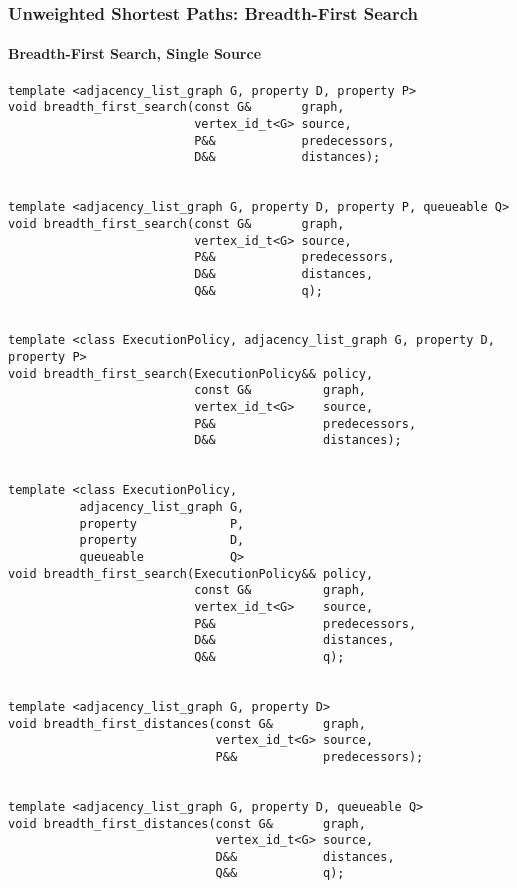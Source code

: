 \subsubsection{Unweighted Shortest Paths: Breadth-First Search}

\paragraph{Breadth-First Search, Single Source}
\begin{lstlisting}
template <adjacency_list_graph G, property D, property P>
void breadth_first_search(const G&       graph,
                          vertex_id_t<G> source,
                          P&&            predecessors,
                          D&&            distances);


template <adjacency_list_graph G, property D, property P, queueable Q>
void breadth_first_search(const G&       graph,
                          vertex_id_t<G> source,
                          P&&            predecessors,
                          D&&            distances,
                          Q&&            q);


template <class ExecutionPolicy, adjacency_list_graph G, property D, property P>
void breadth_first_search(ExecutionPolicy&& policy,
                          const G&          graph,
                          vertex_id_t<G>    source,
                          P&&               predecessors,
                          D&&               distances);


template <class ExecutionPolicy,
          adjacency_list_graph G,
          property             P,
          property             D,
          queueable            Q>
void breadth_first_search(ExecutionPolicy&& policy,
                          const G&          graph,
                          vertex_id_t<G>    source,
                          P&&               predecessors,
                          D&&               distances,
                          Q&&               q);


template <adjacency_list_graph G, property D>
void breadth_first_distances(const G&       graph,
                             vertex_id_t<G> source,
                             P&&            predecessors);


template <adjacency_list_graph G, property D, queueable Q>
void breadth_first_distances(const G&       graph,
                             vertex_id_t<G> source,
                             D&&            distances,
                             Q&&            q);



\end{lstlisting}

